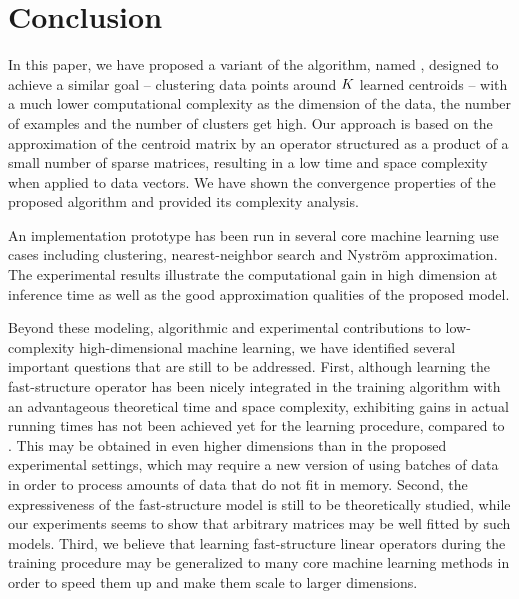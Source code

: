 \section{Conclusion}
\label{sec:conclusion}

In this paper, we have proposed a variant of the \kmeans algorithm, named \qkmeans, designed to achieve a similar goal -- clustering data points around $K$ learned centroids -- with a much lower computational complexity as the dimension of the data, the number of examples and the number of clusters get high. Our approach is based on the approximation of the centroid matrix by an operator structured as a product of a small number of sparse matrices, resulting in a low time and space complexity when applied to data vectors.
We have shown the convergence properties of the proposed algorithm and provided its complexity analysis.

An implementation prototype has been run in several core machine learning use cases including clustering, nearest-neighbor search and Nystr\"om approximation. The experimental results illustrate the computational gain in high dimension at inference time as well as the good approximation qualities of the proposed model.

Beyond these modeling, algorithmic and experimental contributions to low-complexity high-dimensional machine learning, we have identified several important questions that are still to be addressed.
First, although learning the fast-structure operator has been nicely integrated in the training algorithm with an advantageous theoretical time and space complexity, exhibiting gains in actual running times has not been achieved yet for the \qkmeans learning procedure, compared to \kmeans.
This may be obtained in even higher dimensions than in the proposed experimental settings, which may require a new version of \qkmeans using batches of data in order to process amounts of data that do not fit in memory.
Second, the expressiveness of the fast-structure model is still to be theoretically studied, while our experiments seems to show that arbitrary matrices may be well fitted by such models.
Third, we believe that learning fast-structure linear operators during the training procedure may be generalized to many core machine learning methods in order to speed them up and make them scale to larger dimensions.


